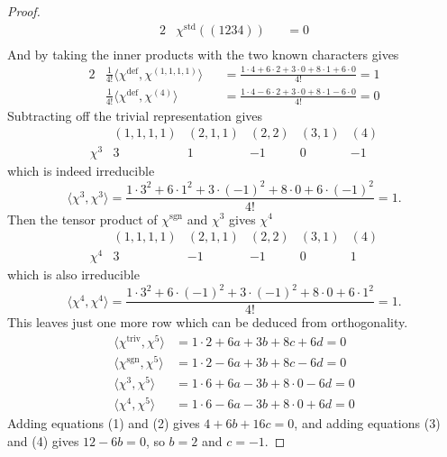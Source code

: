 \documentclass{article}
\newcommand{\ang}[1]{\langle #1 \rangle}
\begin{document}
\begin{proof}
\begin{alignat*}{2}
      &\chi^\text{std}((1234)) &&= 0 \\
  \end{alignat*}
  And by taking the inner products with the two known characters gives \begin{alignat*}{2}
    &\frac{1}{4!}\ang{\chi^\text{def}, \chi^{(1,1,1,1)}} &&= \frac{
      1 \cdot 4 +
      6 \cdot 2 +
      3 \cdot 0 +
      8 \cdot 1 +
      6 \cdot 0
    }{4!} = 1 \\
    &\frac{1}{4!}\ang{\chi^\text{def}, \chi^{(4)}} &&= \frac{
      1 \cdot 4
      - 6 \cdot 2
      + 3 \cdot 0
      + 8 \cdot 1
      - 6 \cdot 0
    }{4!} = 0
  \end{alignat*}
  Subtracting off the trivial representation gives
  \[
    \begin{array}{ l|rrrrr }
            & (1,1,1,1) & (2,1,1) & (2,2) & (3,1) & (4) \\ \hline
     \chi^3 & 3 & 1 & -1 &  0 & -1
   \end{array}
  \]
  which is indeed irreducible
  \[
    \ang{\chi^3,\chi^3} = \frac{
      1 \cdot 3^2 +
      6 \cdot 1^2 +
      3 \cdot (-1)^2 +
      8 \cdot 0 +
      6 \cdot (-1)^2
    }{4!} = 1.
  \]
  Then the tensor product of $\chi^\text{sgn}$ and $\chi^3$ gives $\chi^4$
  \[
    \begin{array}{ l|rrrrr }
            & (1,1,1,1) & (2,1,1) & (2,2) & (3,1) & (4) \\ \hline
     \chi^4 & 3 & -1 & -1 &  0 & 1
   \end{array}
  \]
  which is also irreducible
  \[
    \ang{\chi^4,\chi^4} = \frac{
      1 \cdot 3^2 +
      6 \cdot (-1)^2 +
      3 \cdot (-1)^2 +
      8 \cdot 0 +
      6 \cdot 1^2
    }{4!} = 1.
  \]
  This leaves just one more row which can be deduced from orthogonality.
  \begin{align}
    \ang{\chi^\text{triv}, \chi^5} &=
    1 \cdot 2 +
    6a +
    3b +
    8c +
    6d = 0 \\
    \ang{\chi^\text{sgn}, \chi^5} &=
    1 \cdot 2 -
    6a +
    3b +
    8c -
    6d = 0 \\
    \ang{\chi^3, \chi^5} &=
    1 \cdot 6 +
    6a -
    3b +
    8 \cdot 0 -
    6d = 0 \\
    \ang{\chi^4, \chi^5} &=
    1 \cdot 6 -
    6a -
    3b +
    8 \cdot 0 +
    6d = 0
  \end{align}
  Adding equations (1) and (2) gives $4 + 6b + 16c = 0$, and
  adding equations (3) and (4) gives $12 - 6b = 0$, so $b = 2$ and $c = -1$.


\end{proof}
\end{document}
